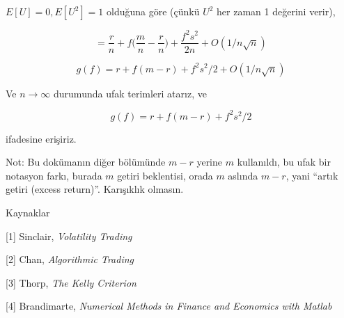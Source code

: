 \documentclass[12pt,fleqn]{article}\usepackage{../../common}
\begin{document}
$E[U] = 0, E[U^2] = 1$ olduğuna göre (çünkü $U^2$ her zaman 1 değerini verir), 

$$ 
= \frac{r}{n} + f \big( \frac{m}{n} - \frac{r}{n} \big) + 
\frac{f^2s^2}{2n} + 
O(1/n \sqrt{n})
$$

$$ g(f) = r + f(m-r) + f^2s^2/2 + O(1/n \sqrt{n}) $$

Ve $n \to \infty$ durumunda ufak terimleri atarız, ve 

$$ g(f) = r + f(m-r) + f^2s^2/2 $$

ifadesine erişiriz. 

Not: Bu dokümanın diğer bölümünde $m-r$ yerine $m$ kullanıldı, bu ufak bir
notasyon farkı, burada $m$ getiri beklentisi, orada $m$ aslında $m-r$, yani
``artık getiri (excess return)''. Karışıklık olmasın.


Kaynaklar

[1] Sinclair, {\em Volatility Trading}

[2] Chan, {\em Algorithmic Trading}

[3] Thorp, {\em The Kelly Criterion}

[4] Brandimarte, {\em Numerical Methods in Finance and Economics with Matlab}
\end{document}
